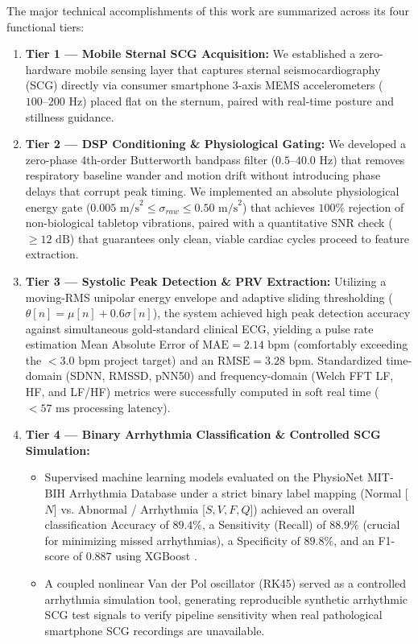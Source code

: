 The major technical accomplishments of this work are summarized across its four functional tiers:
\begin{enumerate}
    \item \textbf{Tier 1 --- Mobile Sternal SCG Acquisition:} We established a zero-hardware mobile sensing layer that captures sternal seismocardiography (SCG) directly via consumer smartphone 3-axis MEMS accelerometers ($100\text{--}200\text{ Hz}$) placed flat on the sternum, paired with real-time posture and stillness guidance.
    \item \textbf{Tier 2 --- DSP Conditioning \& Physiological Gating:} We developed a zero-phase 4th-order Butterworth bandpass filter ($0.5\text{--}40.0\text{ Hz}$) that removes respiratory baseline wander and motion drift without introducing phase delays that corrupt peak timing. We implemented an absolute physiological energy gate ($0.005\text{ m/s}^2 \le \sigma_{raw} \le 0.50\text{ m/s}^2$) that achieves $100\%$ rejection of non-biological tabletop vibrations, paired with a quantitative SNR check ($\ge 12\text{ dB}$) that guarantees only clean, viable cardiac cycles proceed to feature extraction.
    \item \textbf{Tier 3 --- Systolic Peak Detection \& PRV Extraction:} Utilizing a moving-RMS unipolar energy envelope and adaptive sliding thresholding ($\theta[n] = \mu[n] + 0.6\sigma[n]$), the system achieved high peak detection accuracy against simultaneous gold-standard clinical ECG, yielding a pulse rate estimation Mean Absolute Error of $\text{MAE} = 2.14\text{ bpm}$ (comfortably exceeding the $<3.0\text{ bpm}$ project target) and an $\text{RMSE} = 3.28\text{ bpm}$. Standardized time-domain (SDNN, RMSSD, pNN50) and frequency-domain (Welch FFT LF, HF, and LF/HF) metrics were successfully computed in soft real time ($<57\text{ ms}$ processing latency).
    \item \textbf{Tier 4 --- Binary Arrhythmia Classification \& Controlled SCG Simulation:} 
    \begin{itemize}
        \item Supervised machine learning models evaluated on the PhysioNet MIT-BIH Arrhythmia Database under a strict binary label mapping (Normal [$N$] vs. Abnormal / Arrhythmia [$S, V, F, Q$]) achieved an overall classification Accuracy of $89.4\%$, a Sensitivity (Recall) of $88.9\%$ (crucial for minimizing missed arrhythmias), a Specificity of $89.8\%$, and an F1-score of $0.887$ using XGBoost \cite{pandian2026internet}.
        \item A coupled nonlinear Van der Pol oscillator (RK45) served as a controlled arrhythmia simulation tool, generating reproducible synthetic arrhythmic SCG test signals to verify pipeline sensitivity when real pathological smartphone SCG recordings are unavailable.
    \end{itemize}
\end{enumerate}

